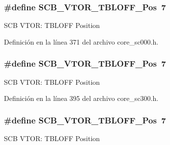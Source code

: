 \subsubsection[{\texorpdfstring{S\+C\+B\+\_\+\+V\+T\+O\+R\+\_\+\+T\+B\+L\+O\+F\+F\+\_\+\+Pos}{SCB_VTOR_TBLOFF_Pos}}]{\setlength{\rightskip}{0pt plus 5cm}\#define S\+C\+B\+\_\+\+V\+T\+O\+R\+\_\+\+T\+B\+L\+O\+F\+F\+\_\+\+Pos~7}\hypertarget{group___c_m_s_i_s___s_c_b_gac6a55451ddd38bffcff5a211d29cea78}{}\label{group___c_m_s_i_s___s_c_b_gac6a55451ddd38bffcff5a211d29cea78}
S\+CB V\+T\+OR\+: T\+B\+L\+O\+FF Position 

Definición en la línea 371 del archivo core\+\_\+sc000.\+h.

\subsubsection[{\texorpdfstring{S\+C\+B\+\_\+\+V\+T\+O\+R\+\_\+\+T\+B\+L\+O\+F\+F\+\_\+\+Pos}{SCB_VTOR_TBLOFF_Pos}}]{\setlength{\rightskip}{0pt plus 5cm}\#define S\+C\+B\+\_\+\+V\+T\+O\+R\+\_\+\+T\+B\+L\+O\+F\+F\+\_\+\+Pos~7}\hypertarget{group___c_m_s_i_s___s_c_b_gac6a55451ddd38bffcff5a211d29cea78}{}\label{group___c_m_s_i_s___s_c_b_gac6a55451ddd38bffcff5a211d29cea78}
S\+CB V\+T\+OR\+: T\+B\+L\+O\+FF Position 

Definición en la línea 395 del archivo core\+\_\+sc300.\+h.

\subsubsection[{\texorpdfstring{S\+C\+B\+\_\+\+V\+T\+O\+R\+\_\+\+T\+B\+L\+O\+F\+F\+\_\+\+Pos}{SCB_VTOR_TBLOFF_Pos}}]{\setlength{\rightskip}{0pt plus 5cm}\#define S\+C\+B\+\_\+\+V\+T\+O\+R\+\_\+\+T\+B\+L\+O\+F\+F\+\_\+\+Pos~7}\hypertarget{group___c_m_s_i_s___s_c_b_gac6a55451ddd38bffcff5a211d29cea78}{}\label{group___c_m_s_i_s___s_c_b_gac6a55451ddd38bffcff5a211d29cea78}
S\+CB V\+T\+OR\+: T\+B\+L\+O\+FF Position 

